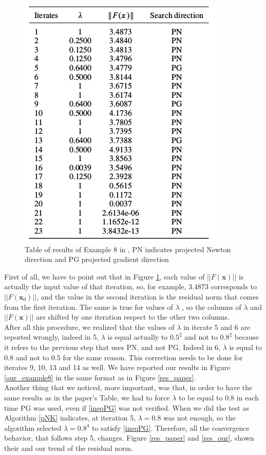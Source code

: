 \begin{figure}[h]
	\centering
	\includegraphics[width=0.6\linewidth]{results_example8}
	\caption[Table of results of example 8 in \cite{MAIN}]{Table of results of Example 8 in \cite{MAIN}, PN indicates projected Newton direction and PG projected gradient direction}
	\label{results_example8}
\end{figure}
First of all, we have to point out that in Figure \ref{results_example8}, each value of $ ||F(\textbf{x})|| $ is actually the input value of that iteration, so, for example, $ 3.4873 $ corresponds to $ ||F(\textbf{x}_0)|| $, and the value in the second iteration is the residual norm that comes from the first iteration. The same is true for values of $ \lambda $ , so the columns of $ \lambda $ and $ ||F(\textbf{x})|| $ are shifted by one iteration respect to the other two columns.\\
After all this procedure, we realized that the values of $ \lambda $ in iterate 5 and 6 are reported wrongly, indeed in 5, $ \lambda $ is equal actually to $ 0.5^2 $ and not to $ 0.8^2 $ because it refers to the previous step that uses PN, and not PG. Indeed in 6, $ \lambda$ is equal to $0.8 $ and not to $ 0.5 $ for the same reason. This correction needs to be done for iterates 9, 10, 13 and 14 as well. We have reported our results in Figure \ref{our_example8} in the same format as in Figure \ref{res_paper}.\\
Another thing that we noticed, more important, was that, in order to have the same results as in the paper's Table, we had to force $ \lambda $ to be equal to $ 0.8 $ in each time PG was used, even if \eqref{ineqPG} was not verified. When we did the test as Algorithm \ref{pNK} indicates, at iteration 5, $ \lambda = 0.8 $ was not enough, so the algorithm selected $ \lambda = 0.8^4 $ to satisfy \eqref{ineqPG}. Therefore, all the convergence behavior, that follows step 5, changes. Figure \ref{res_paper} and \ref{res_our}, shown their and our trend of the residual norm.\\
